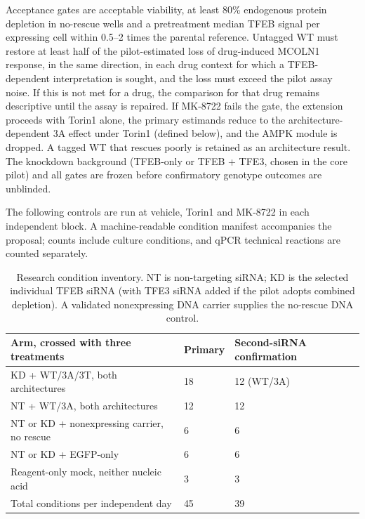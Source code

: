 Acceptance gates are acceptable viability, at least 80\% endogenous protein depletion in no-rescue wells and a pretreatment median TFEB signal per expressing cell within 0.5--2 times the parental reference. Untagged WT must restore at least half of the pilot-estimated loss of drug-induced MCOLN1 response, in the same direction, in each drug context for which a TFEB-dependent interpretation is sought, and the loss must exceed the pilot assay noise. If this is not met for a drug, the comparison for that drug remains descriptive until the assay is repaired. If MK-8722 fails the gate, the extension proceeds with Torin1 alone, the primary estimands reduce to the architecture-dependent 3A effect under Torin1 (defined below), and the AMPK module is dropped. A tagged WT that rescues poorly is retained as an architecture result. The knockdown background (TFEB-only or TFEB + TFE3, chosen in the core pilot) and all gates are frozen before confirmatory genotype outcomes are unblinded.

The following controls are run at vehicle, Torin1 and MK-8722 in each independent block. A machine-readable condition manifest accompanies the proposal; counts include culture conditions, and qPCR technical reactions are counted separately.
\begin{table}[htbp]\centering\small
\caption{Research condition inventory. NT is non-targeting siRNA; KD is the selected individual TFEB siRNA (with TFE3 siRNA added if the pilot adopts combined depletion). A validated nonexpressing DNA carrier supplies the no-rescue DNA control.}\label{tab:research-inventory}
\begin{tabularx}{\textwidth}{L{0.57\textwidth}L{0.14\textwidth}Y}
\toprule Arm, crossed with three treatments & Primary & Second-siRNA confirmation \\
\midrule
KD + WT/3A/3T, both architectures & 18 & 12 (WT/3A) \\
NT + WT/3A, both architectures & 12 & 12 \\
NT or KD + nonexpressing carrier, no rescue & 6 & 6 \\
NT or KD + EGFP-only & 6 & 6 \\
Reagent-only mock, neither nucleic acid & 3 & 3 \\
\midrule Total conditions per independent day & 45 & 39 \\
\bottomrule
\end{tabularx}
\end{table}

